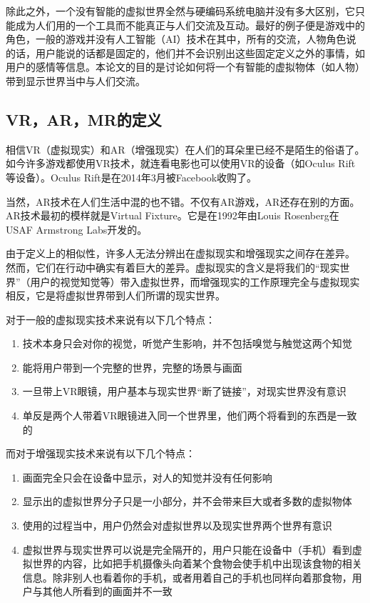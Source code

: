 \documentclass{llncs}
\begin{document}
除此之外，一个没有智能的虚拟世界全然与硬编码系统电脑并没有多大区别，它只能成为人们用的一个工具而不能真正与人们交流及互动。最好的例子便是游戏中的角色，一般的游戏并没有人工智能（AI）技术在其中，所有的交流，人物角色说的话，用户能说的话都是固定的，他们并不会识别出这些固定定义之外的事情，如用户的感情等信息。本论文的目的是讨论如何将一个有智能的虚拟物体（如人物）带到显示世界当中与人们交流。

\subsection{VR，AR，MR的定义}
相信VR（虚拟现实）和AR（增强现实）在人们的耳朵里已经不是陌生的俗语了。如今许多游戏都使用VR技术，就连看电影也可以使用VR的设备（如Oculus Rift等设备）。Oculus Rift是在2014年3月被Facebook收购了\cite{hoffman2014feasibility}。

当然，AR技术在人们生活中混的也不错。不仅有AR游戏，AR还存在别的方面。AR技术最初的模样就是Virtual Fixture。它是在1992年由Louis Rosenberg在USAF Armstrong Labs开发的\cite{DBLP:conf/vr/Rosenberg93a}。

由于定义上的相似性，许多人无法分辨出在虚拟现实和增强现实之间存在差异。 然而，它们在行动中确实有着巨大的差异。虚拟现实的含义是将我们的“现实世界”（用户的视觉知觉等）带入虚拟世界，而增强现实的工作原理完全与虚拟现实相反，它是将虚拟世界带到人们所谓的现实世界\cite{feiner1993knowledge}。

对于一般的虚拟现实技术来说有以下几个特点：
\begin{enumerate}
	\item 技术本身只会对你的视觉，听觉产生影响，并不包括嗅觉与触觉这两个知觉
	\item 能将用户带到一个完整的世界，完整的场景与画面
	\item 一旦带上VR眼镜，用户基本与现实世界“断了链接”，对现实世界没有意识
	\item 单反是两个人带着VR眼镜进入同一个世界里，他们两个将看到的东西是一致的
\end{enumerate}

而对于增强现实技术来说有以下几个特点：
\begin{enumerate}
	\item 画面完全只会在设备中显示，对人的知觉并没有任何影响
	\item 显示出的虚拟世界分子只是一小部分，并不会带来巨大或者多数的虚拟物体
	\item 使用的过程当中，用户仍然会对虚拟世界以及现实世界两个世界有意识
	\item 虚拟世界与现实世界可以说是完全隔开的，用户只能在设备中（手机）看到虚拟世界的内容，比如把手机摄像头向着某个食物会使手机中出现该食物的相关信息。除非别人也看着你的手机，或者用着自己的手机也同样向着那食物，用户与其他人所看到的画面并不一致
\end{enumerate}
\end{document}
